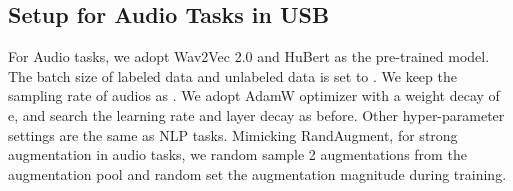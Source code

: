 \documentclass{article}
\begin{document}
\begin{table}[!htbp]
\centering
\caption{Hyper-parameters of NLP tasks in USB.}
\label{tab:hyper-nlp}
\end{table}


\subsection{Setup for Audio Tasks in USB}
For Audio tasks, we adopt Wav2Vec 2.0 \cite{baevski2020wav2vec} and HuBert \cite{hsu2021hubert} as the pre-trained model.
The batch size of labeled data and unlabeled data is set to .
We keep the sampling rate of audios as .
We adopt AdamW optimizer with a weight decay of e, and search the learning rate and layer decay as before.
Other hyper-parameter settings are the same as NLP tasks. Mimicking RandAugment, for strong augmentation in audio tasks, we random sample 2 augmentations from the augmentation pool and random set the augmentation magnitude during training.
\end{document}
